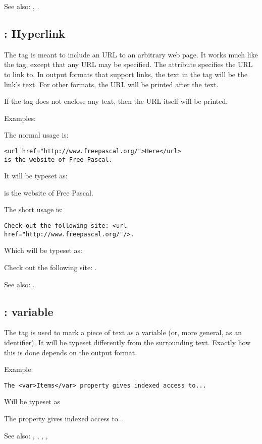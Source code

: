 See also: , .


\subsection{ : Hyperlink}
\label{tag:url}
The  tag is meant to include an URL to an arbitrary web page. It
works much like the  tag, except that any URL may be specified.
The attribute  specifies the URL to link to. In output formats
that support links, the text in the  tag will be the link's text.
For other formats, the URL will be printed after the text.

If the  tag does not enclose any text, then the URL itself will
be printed.

Examples:

The normal usage is:
\begin{verbatim}
<url href="http://www.freepascal.org/">Here</url> 
is the website of Free Pascal.
\end{verbatim}
It will be typeset as:

 is the website of Free Pascal.

The short usage is:
\begin{verbatim}
Check out the following site: <url href="http://www.freepascal.org/"/>.
\end{verbatim}
Which will be typeset as:

Check out the following site: .

See also: .

\subsection{ : variable}
\label{tag:var}
The  tag is used to mark a piece of text as a variable (or, more
general, as an identifier). It will be typeset differently from the 
surrounding text. Exactly how this is done depends on the output format.

Example:
\begin{verbatim}
The <var>Items</var> property gives indexed access to...
\end{verbatim}
Will be typeset as

The  property gives indexed access to...

See also: , , , ,  

